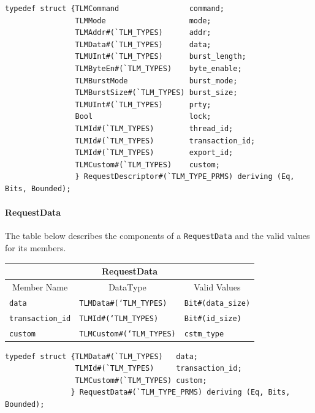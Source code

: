 \documentclass[twoside,letterpaper]{article}
\newcommand{\te}[1]{\texttt{#1}}
\begin{document}
\begin{verbatim}
typedef struct {TLMCommand                command;
                TLMMode                   mode;
                TLMAddr#(`TLM_TYPES)      addr;
                TLMData#(`TLM_TYPES)      data;
                TLMUInt#(`TLM_TYPES)      burst_length;
                TLMByteEn#(`TLM_TYPES)    byte_enable;
                TLMBurstMode              burst_mode;
                TLMBurstSize#(`TLM_TYPES) burst_size;
                TLMUInt#(`TLM_TYPES)      prty;
                Bool                      lock;
                TLMId#(`TLM_TYPES)        thread_id;
                TLMId#(`TLM_TYPES)        transaction_id;
                TLMId#(`TLM_TYPES)        export_id;
                TLMCustom#(`TLM_TYPES)    custom;
                } RequestDescriptor#(`TLM_TYPE_PRMS) deriving (Eq, Bits, Bounded);
\end{verbatim}


\paragraph{RequestData} The table below describes the components of a
                \te{RequestData}  and the valid values for its members.

\begin{center}
\begin{tabular}{|p{1.2 in}|p{2 in}|p{3in}|}
\hline
\multicolumn{3}{|c|}{RequestData} \\
\hline
\multicolumn{1}{|c|}{Member Name}&\multicolumn{1}{|c|}{DataType}&\multicolumn{1}{|c|}{Valid Values} \\
\hline
\hline
\te{data}&\te{TLMData\#(`TLM\_TYPES)}&\te{Bit\#(data\_size)}\\
\hline
\te{transaction\_id}&\te{TLMId\#(`TLM\_TYPES)}&\te{Bit\#(id\_size)}\\
\hline
\te{custom}&\te{TLMCustom\#(`TLM\_TYPES)}&\te{cstm\_type}\\
\hline
\end{tabular}
\end{center}


\begin{verbatim}
typedef struct {TLMData#(`TLM_TYPES)   data;
                TLMId#(`TLM_TYPES)     transaction_id;
                TLMCustom#(`TLM_TYPES) custom;
               } RequestData#(`TLM_TYPE_PRMS) deriving (Eq, Bits, Bounded);
\end{verbatim}
\end{document}
